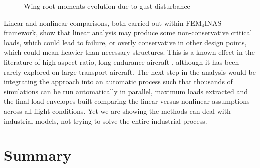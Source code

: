\documentclass[11pt]{article}
\begin{document}
\begin{figure}[ht!]
\centering
{}
\caption{Wing root moments evolution due to gust disturbance}\label{fig8:MxMy}
\end{figure}
Linear and nonlinear comparisons, both carried out within FEM$_4$INAS framework, show that linear analysis may produce some  non-conservative critical loads, which could lead to failure, or overly conservative in other design points, which could mean heavier than necessary structures. This is a known effect in the literature of high aspect ratio, long endurance aircraft \cite{Palacios2014}, although it has been rarely explored on large transport aircraft. The next step in the analysis would be integrating the approach into an automatic process such that thousands of simulations can be run automatically  in parallel, maximum loads extracted and the final load envelopes built comparing the linear versus nonlinear assumptions across all flight conditions. Yet we are showing the methods can deal with industrial models, not trying to solve  the entire industrial process. 
\\

\section{Summary}
\label{sec:summary}




\end{document}
